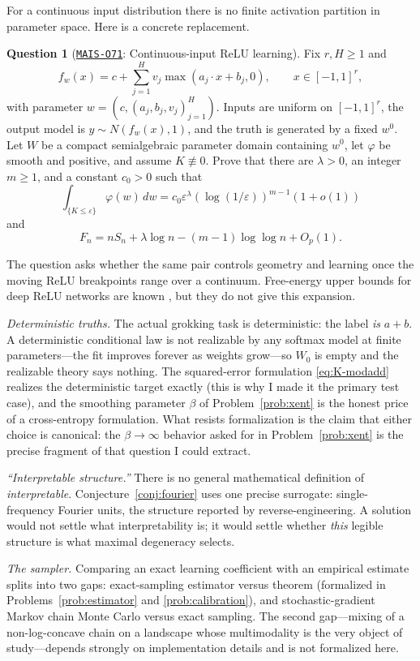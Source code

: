 \documentclass[11pt]{amsart}
\newcommand{\Oid}[1]{\href{https://github.com/lionellevine/MAIS/blob/main/open-problems/MAIS-O#1.md}{\texttt{MAIS-O#1}}}
\theoremstyle{plain}
\theoremstyle{definition}
\newtheorem{question}[theorem]{Question}
\begin{document}
For a continuous input distribution there is no finite activation partition in parameter space. Here is a concrete replacement.

\begin{question}[\Oid{71}: Continuous-input ReLU learning]\label{q:relu}
Fix $r,H\ge1$ and
\[
 f_w(x)=c+\sum_{j=1}^H v_j\max(a_j\cdot x+b_j,0),
 \qquad x\in[-1,1]^r,
\]
with parameter $w=(c,(a_j,b_j,v_j)_{j=1}^H)$. Inputs are uniform on $[-1,1]^r$, the output model is $y\sim N(f_w(x),1)$, and the truth is generated by a fixed $w^0$. Let $W$ be a compact semialgebraic parameter domain containing $w^0$, let $\varphi$ be smooth and positive, and assume $K\not\equiv0$. Prove that there are $\lambda>0$, an integer $m\ge1$, and a constant $c_0>0$ such that
\[
 \int_{\{K\le\varepsilon\}}\varphi(w)\,dw
 =c_0\varepsilon^\lambda(\log(1/\varepsilon))^{m-1}(1+o(1))
\]
and
\[
 F_n=nS_n+\lambda\log n-(m-1)\log\log n+O_p(1).
\]
\end{question}

The question asks whether the same pair controls geometry and learning once the moving ReLU breakpoints range over a continuum. Free-energy upper bounds for deep ReLU networks are known \cite{nagayasu2023}, but they do not give this expansion.

\emph{Deterministic truths.} The actual grokking task is deterministic: the label \emph{is} $a + b$. A deterministic conditional law is not realizable by any softmax model at finite parameters---the fit improves forever as weights grow---so $W_0$ is empty and the realizable theory says nothing. The squared-error formulation \eqref{eq:K-modadd} realizes the deterministic target exactly (this is why I made it the primary test case), and the smoothing parameter $\beta$ of Problem~\ref{prob:xent} is the honest price of a cross-entropy formulation. What resists formalization is the claim that either choice is canonical: the $\beta \to \infty$ behavior asked for in Problem~\ref{prob:xent} is the precise fragment of that question I could extract.

\emph{``Interpretable structure.''} There is no general mathematical definition of \emph{interpretable}. Conjecture~\ref{conj:fourier} uses one precise surrogate: single-frequency Fourier units, the structure reported by reverse-engineering. A solution would not settle what interpretability is; it would settle whether \emph{this} legible structure is what maximal degeneracy selects.

\emph{The sampler.} Comparing an exact learning coefficient with an empirical estimate splits into two gaps: exact-sampling estimator versus theorem (formalized in Problems~\ref{prob:estimator} and \ref{prob:calibration}), and stochastic-gradient Markov chain Monte Carlo versus exact sampling. The second gap---mixing of a non-log-concave chain on a landscape whose multimodality is the very object of study---depends strongly on implementation details and is not formalized here.
\end{document}
